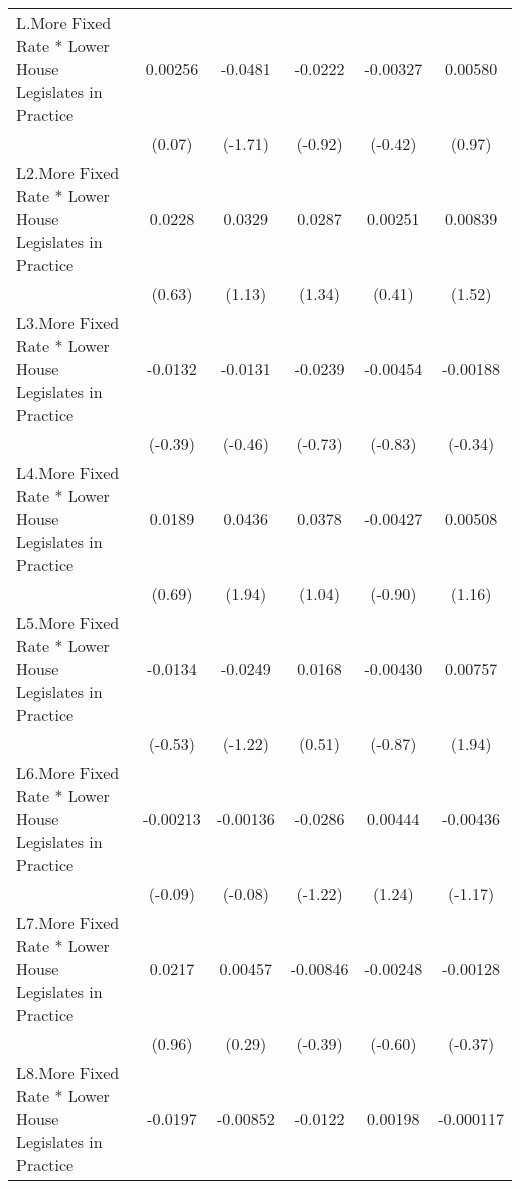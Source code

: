 {\begin{longtable}{l*{5}{c}}
L.More Fixed Rate * Lower House Legislates in Practice&  0.00256         &  -0.0481         &  -0.0222         & -0.00327         &  0.00580         \\
                &   (0.07)         &  (-1.71)         &  (-0.92)         &  (-0.42)         &   (0.97)         \\
[1em]
L2.More Fixed Rate * Lower House Legislates in Practice&   0.0228         &   0.0329         &   0.0287         &  0.00251         &  0.00839         \\
                &   (0.63)         &   (1.13)         &   (1.34)         &   (0.41)         &   (1.52)         \\
[1em]
L3.More Fixed Rate * Lower House Legislates in Practice&  -0.0132         &  -0.0131         &  -0.0239         & -0.00454         & -0.00188         \\
                &  (-0.39)         &  (-0.46)         &  (-0.73)         &  (-0.83)         &  (-0.34)         \\
[1em]
L4.More Fixed Rate * Lower House Legislates in Practice&   0.0189         &   0.0436         &   0.0378         & -0.00427         &  0.00508         \\
                &   (0.69)         &   (1.94)         &   (1.04)         &  (-0.90)         &   (1.16)         \\
[1em]
L5.More Fixed Rate * Lower House Legislates in Practice&  -0.0134         &  -0.0249         &   0.0168         & -0.00430         &  0.00757         \\
                &  (-0.53)         &  (-1.22)         &   (0.51)         &  (-0.87)         &   (1.94)         \\
[1em]
L6.More Fixed Rate * Lower House Legislates in Practice& -0.00213         & -0.00136         &  -0.0286         &  0.00444         & -0.00436         \\
                &  (-0.09)         &  (-0.08)         &  (-1.22)         &   (1.24)         &  (-1.17)         \\
[1em]
L7.More Fixed Rate * Lower House Legislates in Practice&   0.0217         &  0.00457         & -0.00846         & -0.00248         & -0.00128         \\
                &   (0.96)         &   (0.29)         &  (-0.39)         &  (-0.60)         &  (-0.37)         \\
[1em]
L8.More Fixed Rate * Lower House Legislates in Practice&  -0.0197         & -0.00852         &  -0.0122         &  0.00198         &-0.000117         \\

\end{longtable}}
